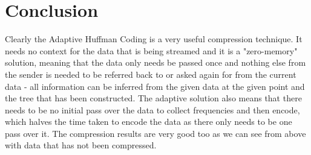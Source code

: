 \documentclass[12pt, letterpaper]{article}
\begin{document}
\section{Conclusion}
Clearly the Adaptive Huffman Coding is a very useful compression technique. It needs no context for the data that is being streamed and it is a "zero-memory" solution, meaning that the data only needs be passed once and nothing else from the sender is needed to be referred back to or asked again for from the current data - all information can be inferred from the given data at the given point and the tree that has been constructed. The adaptive solution also means that there needs to be no initial pass over the data to collect frequencies and then encode, which halves the time taken to encode the data as there only needs to be one pass over it. The compression results are very good too as we can see from above with data that has not been compressed.
\end{document}
